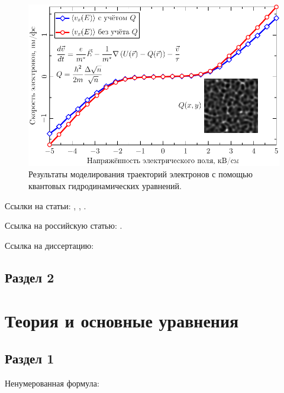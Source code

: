 \documentclass[a4paper,14pt]{extarticle}
\begin{document}
\begin{figure}[ht]
    \begin{center}
        \includegraphics{images/iv-curve.pdf}
        \caption{\label{fig:iv-curve-1}
            Результаты моделирования траекторий электронов с помощью квантовых гидродинамических уравнений.}
    \end {center}
    \end {figure}
    
Ссылки на статьи: \cite{miller1}, \cite{miller2}, \cite{mohseni1}.

Ссылка на российскую статью: \cite{skubachevskii1}.

Ссылка на диссертацию:  \cite{pavlichenko1}

\subsection{Раздел 2}

\pagebreak
\section{Теория и основные уравнения}

\subsection{Раздел 1}

Ненумерованная формула:
\end{document}
